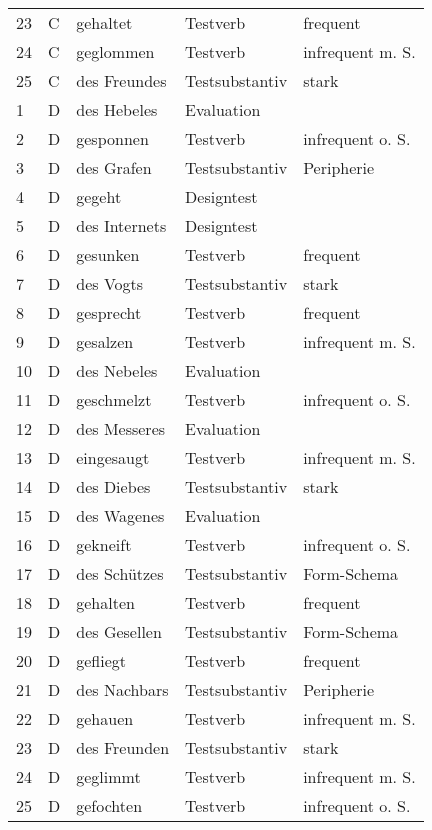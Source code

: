 \begin{small}
\begin{longtable}{lllll}
  23 & C & gehaltet & Testverb & frequent \\ 
 24 & C & geglommen & Testverb & infrequent m. S. \\ 
  25 & C & des Freundes & Testsubstantiv & stark \\ 
	\midrule
   1 & D & des Hebeles & Evaluation &  \\ 
   2 & D & gesponnen & Testverb & infrequent o. S. \\ 
 3 & D & des Grafen & Testsubstantiv & Peripherie \\ 
   4 & D & gegeht & Designtest &  \\ 
5 & D & des Internets & Designtest &  \\ 
 6 & D & gesunken & Testverb & frequent \\ 
 7 & D & des Vogts & Testsubstantiv & stark \\ 
 8 & D & gesprecht & Testverb & frequent \\ 
   9 & D & gesalzen & Testverb & infrequent m. S. \\ 
 10 & D & des Nebeles & Evaluation &  \\ 
  11 & D & geschmelzt & Testverb & infrequent o. S. \\ 
 12 & D & des Messeres & Evaluation &  \\ 
    13 & D & eingesaugt & Testverb & infrequent m. S. \\ 
 14 & D & des Diebes & Testsubstantiv & stark \\ 
  15 & D & des Wagenes & Evaluation &  \\ 
  16 & D & gekneift & Testverb & infrequent o. S. \\ 
   17 & D & des Schützes & Testsubstantiv & Form-Schema \\ 
  18 & D & gehalten & Testverb & frequent \\ 
   19 & D & des Gesellen & Testsubstantiv & Form-Schema \\ 
   20 & D & gefliegt & Testverb & frequent \\ 
 21 & D & des Nachbars & Testsubstantiv & Peripherie \\ 
 22 & D & gehauen & Testverb & infrequent m. S. \\ 
 23 & D & des Freunden & Testsubstantiv & stark \\ 
  24 & D & geglimmt & Testverb & infrequent m. S. \\ 
 25 & D & gefochten & Testverb & infrequent o. S. \\ 
\end{longtable}
\end{small}

